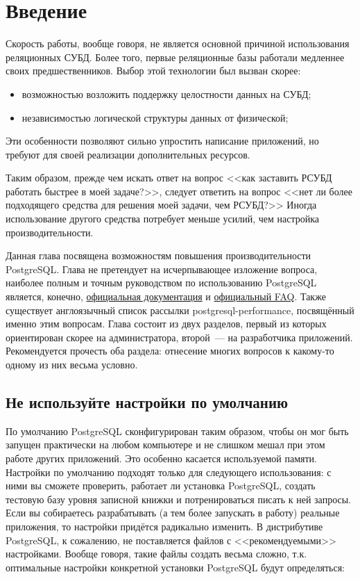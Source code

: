 \section{Введение}

Скорость работы, вообще говоря, не является основной причиной использования реляционных СУБД. Более того, первые реляционные базы работали медленнее своих предшественников. Выбор этой технологии был вызван скорее:

\begin{itemize}
  \item возможностью возложить поддержку целостности данных на СУБД;
  \item независимостью логической структуры данных от физической;
\end{itemize}

Эти особенности позволяют сильно упростить написание приложений, но требуют для своей реализации дополнительных ресурсов.

Таким образом, прежде чем искать ответ на вопрос <<как заставить РСУБД работать быстрее в моей задаче?>>, следует ответить на вопрос <<нет ли более подходящего средства для решения моей задачи, чем РСУБД?>> Иногда использование другого средства потребует меньше усилий, чем настройка производительности.

Данная глава посвящена возможностям повышения производительности PostgreSQL. Глава не претендует на исчерпывающее изложение вопроса, наиболее полным и точным руководством по использованию PostgreSQL является, конечно, \href{http://www.postgresql.org/docs/manuals/}{официальная документация} и \href{https://wiki.postgresql.org/wiki/Category:FAQ}{официальный FAQ}. Также существует англоязычный список рассылки postgresql-performance, посвящённый именно этим вопросам. Глава состоит из двух разделов, первый из которых ориентирован скорее на администратора, второй~--- на разработчика приложений. Рекомендуется прочесть оба раздела: отнесение многих вопросов к какому-то одному из них весьма условно.


\subsection{Не используйте настройки по умолчанию}

По умолчанию PostgreSQL сконфигурирован таким образом, чтобы он мог быть запущен практически на любом компьютере и не слишком мешал при этом работе других приложений. Это особенно касается используемой памяти. Настройки по умолчанию подходят только для следующего использования: с ними вы сможете проверить, работает ли установка PostgreSQL, создать тестовую базу уровня записной книжки и потренироваться писать к ней запросы. Если вы собираетесь разрабатывать (а тем более запускать в работу) реальные приложения, то настройки придётся радикально изменить. В дистрибутиве PostgreSQL, к сожалению, не поставляется файлов с <<рекомендуемыми>> настройками. Вообще говоря, такие файлы создать весьма сложно, т.к. оптимальные настройки конкретной установки PostgreSQL будут определяться:

